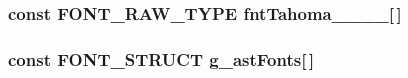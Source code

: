 \subsubsection[{fntTahoma\_\-12\_\-0\_\-0\_\-0}]{\setlength{\rightskip}{0pt plus 5cm}const FONT\_\-RAW\_\-TYPE {\bf fntTahoma\_\_\_\_}[$\,$]}\label{font__table_8c_a82c056098eb55fa36c9e5c127d653145}
\subsubsection[{g\_\-astFonts}]{\setlength{\rightskip}{0pt plus 5cm}const {\bf FONT\_\-STRUCT} {\bf g\_\-astFonts}[$\,$]}\label{font__table_8c_ad8057d150027e7db3f3ed65b70c6c910}
